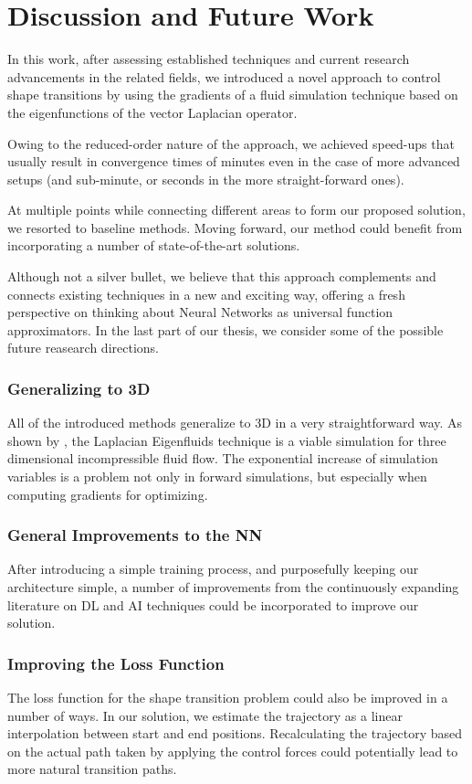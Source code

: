 \chapter{Discussion and Future Work}\label{chapter:discussion}
In this work, after assessing established techniques and current research
advancements in the related fields, we introduced a novel approach to control
shape transitions by using the gradients of a fluid simulation technique based
on the eigenfunctions of the vector Laplacian operator. 

Owing to the reduced-order nature of the approach, we achieved speed-ups that
usually result in convergence times of minutes even in the case of more advanced
setups (and sub-minute, or seconds in the more straight-forward ones).

At multiple points while connecting different areas to form our proposed
solution, we resorted to baseline methods. Moving forward, our method could
benefit from incorporating a number of state-of-the-art solutions.

Although not a silver bullet, we believe that this approach complements and
connects existing techniques in a new and exciting way, offering a fresh
perspective on thinking about Neural Networks as universal function
approximators. In the last part of our thesis, we consider some of the possible
future reasearch directions. 

\subsection*{Generalizing to 3D}
All of the introduced methods generalize to 3D in a very straightforward way. As
shown by \citet{scalable-eigenfluids}, the Laplacian Eigenfluids technique is
a viable simulation for three dimensional incompressible fluid flow. The
exponential increase of simulation variables is a problem not only in forward
simulations, but especially when computing gradients for optimizing. 

\subsection*{General Improvements to the NN}
After introducing a simple training process, and purposefully keeping our
architecture simple, a number of improvements from the continuously expanding
literature on \ac{DL} and \ac{AI} techniques could be incorporated to improve
our solution.

\subsection*{Improving the Loss Function}
The loss function for the shape transition problem could also be improved in
a number of ways. In our solution, we estimate the trajectory as a linear
interpolation between start and end positions. Recalculating the trajectory
based on the actual path taken by applying the control forces could potentially
lead to more natural transition paths.

